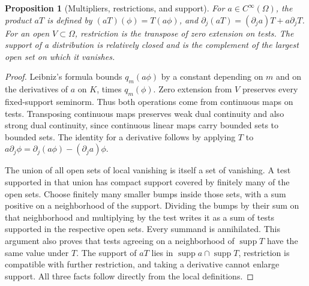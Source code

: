 \documentclass[11pt,oneside,openany]{book}
\newtheorem{proposition}[theorem]{Proposition}
\theoremstyle{definition}
\theoremstyle{remark}
\begin{document}
\begin{proposition}[Multipliers, restrictions, and support]
\label{p102:AN-11-C02-R03}
For \(a\in C^\infty(\Omega)\), the product \(aT\) is defined by \((aT)(\phi)=T(a\phi)\), and \(\partial_j(aT)=(\partial_j a)T+a\partial_jT\). For an open \(V\subset\Omega\), restriction is the transpose of zero extension on tests. The support of a distribution is relatively closed and is the complement of the largest open set on which it vanishes.
\end{proposition}
\begin{proof}
Leibniz's formula bounds \(q_m(a\phi)\) by a constant depending on \(m\) and on the derivatives of \(a\) on \(K\), times \(q_m(\phi)\). Zero extension from \(V\) preserves every fixed-support seminorm. Thus both operations come from continuous maps on tests. Transposing continuous maps preserves weak dual continuity and also strong dual continuity, since continuous linear maps carry bounded sets to bounded sets. The identity for a derivative follows by applying \(T\) to \(a\partial_j\phi=\partial_j(a\phi)-(\partial_j a)\phi\).

The union of all open sets of local vanishing is itself a set of vanishing. A test supported in that union has compact support covered by finitely many of the open sets. Choose finitely many smaller bumps inside those sets, with a sum positive on a neighborhood of the support. Dividing the bumps by their sum on that neighborhood and multiplying by the test writes it as a sum of tests supported in the respective open sets. Every summand is annihilated. This argument also proves that tests agreeing on a neighborhood of \(\operatorname{supp}T\) have the same value under \(T\). The support of \(aT\) lies in \(\operatorname{supp}a\cap\operatorname{supp}T\), restriction is compatible with further restriction, and taking a derivative cannot enlarge support. All three facts follow directly from the local definitions.
\end{proof}
\end{document}
